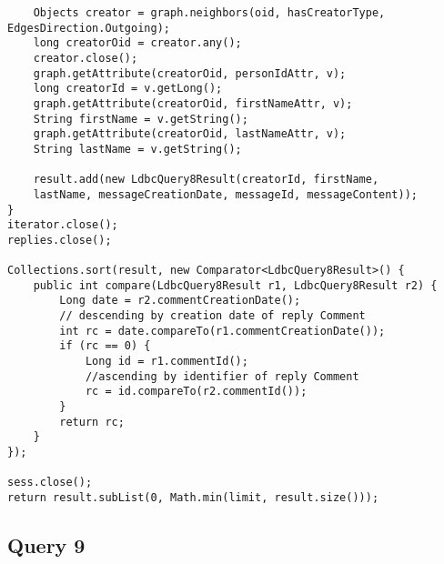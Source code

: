 {\begin{verbatim}
    Objects creator = graph.neighbors(oid, hasCreatorType, EdgesDirection.Outgoing);
    long creatorOid = creator.any();
    creator.close();
    graph.getAttribute(creatorOid, personIdAttr, v);
    long creatorId = v.getLong();
    graph.getAttribute(creatorOid, firstNameAttr, v);
    String firstName = v.getString();
    graph.getAttribute(creatorOid, lastNameAttr, v);
    String lastName = v.getString();

    result.add(new LdbcQuery8Result(creatorId, firstName,
    lastName, messageCreationDate, messageId, messageContent));
}
iterator.close();
replies.close();

Collections.sort(result, new Comparator<LdbcQuery8Result>() {
    public int compare(LdbcQuery8Result r1, LdbcQuery8Result r2) {
        Long date = r2.commentCreationDate();
        // descending by creation date of reply Comment
        int rc = date.compareTo(r1.commentCreationDate()); 
        if (rc == 0) {
            Long id = r1.commentId();
            //ascending by identifier of reply Comment
            rc = id.compareTo(r2.commentId()); 
        }
        return rc;
    }
});

sess.close();
return result.subList(0, Math.min(limit, result.size()));

\end{verbatim}
}

\subsection{Query 9}

